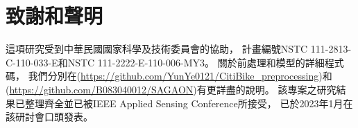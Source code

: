 \documentclass[a4paper,14pt]{extarticle}
\begin{document}
    \newpage
    \section{致謝和聲明}
        
        這項研究受到中華民國國家科學及技術委員會的協助，
        計畫編號NSTC 111-2813-C-110-033-E和NSTC 111-2222-E-110-006-MY3。
        關於前處理和模型的詳細程式碼，
        我們分別在(\url{https://github.com/YunYe0121/CitiBike_preprocessing})和(\url{https://github.com/B083040012/SAGAON})有更詳盡的說明。
        該專案之研究結果已整理齊全並已被IEEE Applied Sensing Conference\cite{SAGAON}所接受，
        已於2023年1月在該研討會口頭發表。

    \clearpage
        \renewcommand\refname{\arabic{section}\hspace{1em}參考文獻}
        
        
\end{document}
